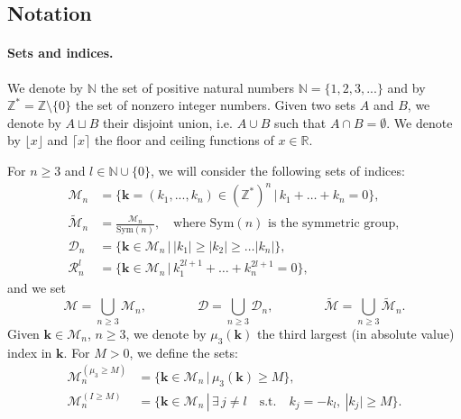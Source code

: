 \documentclass[a4paper,10pt,reqno]{article}
\theoremstyle{definition}
\theoremstyle{plain}
\theoremstyle{plain}
\theoremstyle{definition}
\theoremstyle{plain}
\theoremstyle{plain}
\theoremstyle{plain}
\theoremstyle{definition}
\theoremstyle{definition}
\def \N{\mathbb N}
\def \Z{\mathbb Z}
\def \R{\mathbb R}
\def \M{\mathcal{M}}
\def \k{\bm{k}}
\begin{document}







 


\subsection{Notation}\label{subsec:notation}

\paragraph{Sets and indices.} We denote by $\N$ the set of positive natural numbers
$\N = \{ 1,2,3,...\}$ and by $\Z^* =\Z\setminus\{0\}$ the set of nonzero integer numbers. Given two sets $A$ and $B$, we denote by $A\sqcup B$ their disjoint union, i.e. $A\cup B$ such that $A\cap B=\emptyset$. We denote by $\lfloor x\rfloor$ and $\lceil x\rceil$ the floor and ceiling functions of $x\in\R$.

For $n \ge 3$ and $l \in \N \cup \{0\}$, we will consider the following sets of indices:
\begin{align}
\M_n &= \{ \bm{k} = (k_1,...,k_n) \in (\Z^*)^n \, | \, k_1+\ldots+k_n=0 \}, \label{def: indices zero momentum} \\
\widetilde{\M}_n &= \frac{\M_n}{\mbox{Sym}(n)}, \quad \text{where $\mbox{Sym}(n)$ is the symmetric group}, \label{def: indices zero momentum quotient}  \\
\mathcal{D}_n &= \{ \bm{k}  \in \mathcal{M}_n\, | \, |k_1| \ge |k_2| \ge \ldots |k_n| \}, \label{def: ordered indices zero momentum}  \\
\mathcal{R}_n^{l} &= \{ \bm{k} \in \mathcal{M}_n\, | \, k_1^{2l+1}+\ldots+k_n^{2l+1}=0 \}, \label{def: resonant indices zero momentum} 
\end{align}
and we set
\[
\mathcal{M} = \bigcup_{n \ge 3} \mathcal{M}_n, \qquad \qquad \mathcal{D} = \bigcup_{n \ge 3} \mathcal{D}_n, \qquad \qquad \widetilde{\M} = \bigcup_{n \ge 3} \widetilde{\M}_n.
\]
Given $\k \in \M_n$, $n\geq 3$, we denote by $\mu_3(\k)$ the third largest (in absolute value) index in $\k$. For $M>0$, we define the sets:
\begin{align}
\M_n^{(\mu_3 \ge M)} & = \{ \k \in \M_n \, | \, \mu_3(\k) \ge M \}, \label{insieme terzo indice grande} \\
\M_n^{(I \ge M)} & = \{ \k \in \M_n \, | \, \exists \, j \neq l \quad \text{s.t.} \quad k_j = -k_l,\ |k_j| \ge M \}. \label{insieme azione grande} 
\end{align}
\end{document}
